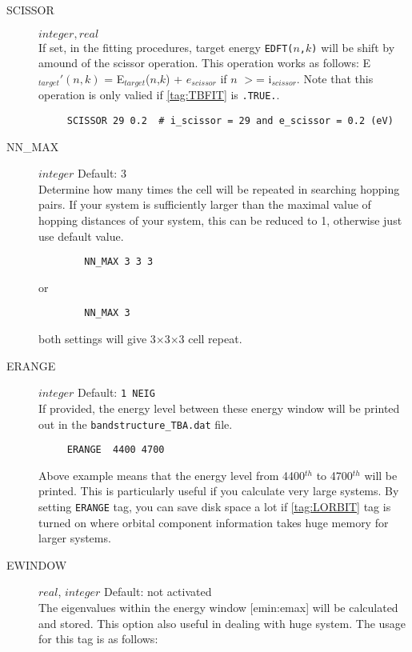 \documentclass[a4paper,12pt]{scrartcl}
\makeatletter
\def\namedlabel#1#2{\begingroup
    #2%
    \def\@currentlabel{#2}%
    \phantomsection\label{#1}\endgroup
}
\makeatother
\begin{document}
\begin{description}
    \item[\namedlabel{tag:SCISSOR}{SCISSOR}] $integer, real$ \\
		If set, in the fitting procedures, target energy \texttt{EDFT($n$,$k$)}
		will be shift by amound of the scissor operation. 
		This operation works as follows: E$_{target}'(n,k)$ = 
		E$_{target}$($n$,$k$) + $e_{scissor}$ if $n$ $>$= i$_{scissor}$.
		Note that this operation is only valied if \ref{tag:TBFIT} is \texttt{.TRUE.}. 
    \begin{verbatim}
     SCISSOR 29 0.2  # i_scissor = 29 and e_scissor = 0.2 (eV)
    \end{verbatim}

	\item[\namedlabel{tag:NNMAX}{NN\_MAX}] $integer$ Default: 3 \\
        Determine how many times the cell will be repeated in searching hopping pairs. 
        If your system is sufficiently larger than the maximal value of hopping
        distances of your system, this can be reduced to 1, otherwise just use default value.
	\begin{verbatim}
		NN_MAX 3 3 3 
	\end{verbatim}
		or
		
	\begin{verbatim}
		NN_MAX 3 
	\end{verbatim}
	
		both settings will give 3$\times$3$\times$3 cell repeat.
		
    \item[\namedlabel{tag:ERANGE}{ERANGE}] $integer$ Default: \texttt{1 NEIG}  \\
		If provided, the energy level between these energy window will be printed
		out in the \texttt{bandstructure\_TBA.dat} file. 
    \begin{verbatim}
     ERANGE  4400 4700  
    \end{verbatim}
		Above example means that the energy level from 4400$^{th}$ to 
		4700$^{th}$ will be printed. 
		This is particularly useful if you calculate very large
		systems. By setting \texttt{ERANGE} tag, you can save disk space
		a lot if \ref{tag:LORBIT} tag is turned on where orbital component
		information takes huge memory for larger systems.

    \item[\namedlabel{tag:EWINDOW}{EWINDOW}] $real$, $integer$ Default: not activated \\
    The eigenvalues within the energy window [emin:emax] will be calculated and stored. This option also useful in dealing with huge system. The usage for this tag is as follows:
    

\end{description}
\end{document}
